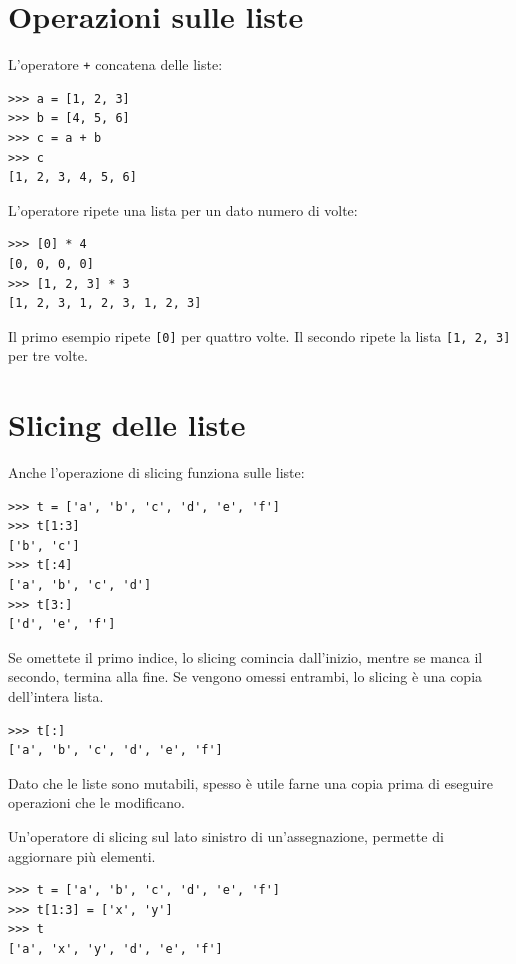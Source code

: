 \documentclass[10pt]{book}
\begin{document}
\section{Operazioni sulle liste}

L'operatore {\tt +} concatena delle liste:

\begin{verbatim}
>>> a = [1, 2, 3]
>>> b = [4, 5, 6]
>>> c = a + b
>>> c
[1, 2, 3, 4, 5, 6]
\end{verbatim}
%
L'operatore {\tt *} ripete una lista per un dato numero di volte:

\begin{verbatim}
>>> [0] * 4
[0, 0, 0, 0]
>>> [1, 2, 3] * 3
[1, 2, 3, 1, 2, 3, 1, 2, 3]
\end{verbatim}
%
Il primo esempio ripete {\tt [0]} per quattro volte. Il secondo ripete la lista {\tt [1, 2, 3]} per tre volte.


\section{Slicing delle liste}

Anche l'operazione di slicing funziona sulle liste:

\begin{verbatim}
>>> t = ['a', 'b', 'c', 'd', 'e', 'f']
>>> t[1:3]
['b', 'c']
>>> t[:4]
['a', 'b', 'c', 'd']
>>> t[3:]
['d', 'e', 'f']
\end{verbatim}
%
Se omettete il primo indice, lo slicing comincia dall'inizio, mentre se manca il secondo, termina alla fine. Se vengono omessi entrambi, lo slicing è una copia dell'intera lista.

\begin{verbatim}
>>> t[:]
['a', 'b', 'c', 'd', 'e', 'f']
\end{verbatim}
%
Dato che le liste sono mutabili, spesso è utile farne una copia prima di eseguire operazioni che le modificano.

Un'operatore di slicing sul lato sinistro di un'assegnazione, permette di aggiornare più elementi.

\begin{verbatim}
>>> t = ['a', 'b', 'c', 'd', 'e', 'f']
>>> t[1:3] = ['x', 'y']
>>> t
['a', 'x', 'y', 'd', 'e', 'f']
\end{verbatim}
%
\end{document}
